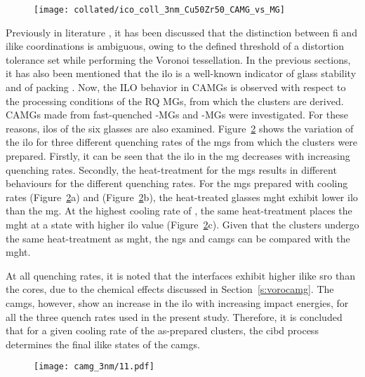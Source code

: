 \begin{figure}[!h] \centering
\texttt{[image: collated/ico\_coll\_3nm\_Cu50Zr50\_CAMG\_vs\_MG]}
\label{f:camg_fi}
\end{figure}

\begin{changebar}
Previously in literature \cite{Ding2014}, it has been discussed that the distinction between \gls{fi} and \gls{ilike} coordinations is ambiguous, owing to the defined threshold of a distortion tolerance set while performing the Voronoi tessellation. In the previous sections, it has also been mentioned that the \gls{ilo} is a well-known indicator of glass stability and of packing \cite{Ding2014,Ding2014a,Yue2018,Cheng2008}. Now, the ILO behavior in CAMGs is observed with respect to the processing conditions of the RQ MGs, from which the clusters are derived. CAMGs made from fast-quenched -MGs and 
-MGs were investigated. For these reasons, \gls{ilo}s of the six glasses are also examined. Figure~\ref{f:camg_ilo} shows the variation of the \gls{ilo} for three different quenching rates of the \gls{mg}s from which the clusters were prepared. Firstly, it can be seen that the \gls{ilo} in the \gls{mg} decreases with increasing quenching rates. Secondly, the heat-treatment for the \gls{mg}s results in different behaviours for the different quenching rates. For the \gls{mg}s prepared with cooling rates  (Figure~\ref{f:camg_ilo}a) and  (Figure~\ref{f:camg_ilo}b), the heat-treated glasses \gls{mght} exhibit lower \gls{ilo} than the \gls{mg}. At the highest cooling rate of , the same heat-treatment places the \gls{mght} at a state with higher \gls{ilo} value (Figure~\ref{f:camg_ilo}c). Given that the clusters undergo the same heat-treatment as \gls{mght}, the \gls{ng}s and \gls{camg}s can be compared with the \gls{mght}. \par

At all quenching rates, it is noted that the interfaces exhibit higher \gls{ilike} \gls{sro} than the cores, due to the chemical effects discussed in Section~\ref{s:vorocamg}. The \gls{camg}s, however, show an increase in the \gls{ilo} with increasing impact energies, for all the three quench rates used in the present study. Therefore, it is concluded that for a given cooling rate of the as-prepared clusters, the \gls{cibd} process determines the final \gls{ilike} states of the \gls{camg}s. \par

\begin{figure}[!h]
	\texttt{[image: camg\_3nm/11.pdf]}
	\label{f:camg_ilo}
\end{figure}
\end{changebar}

